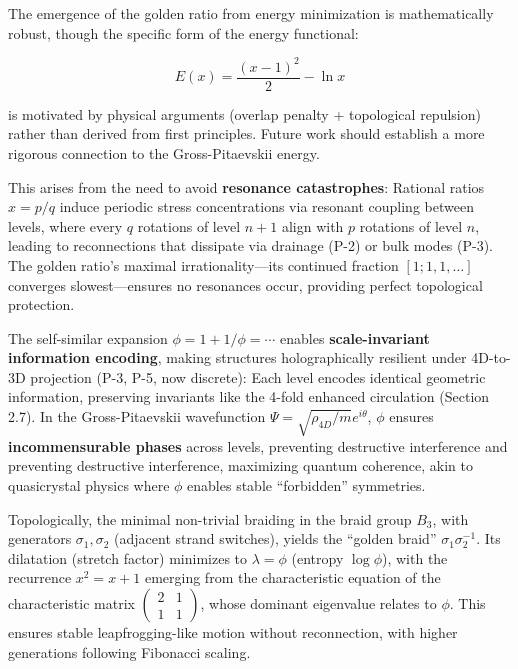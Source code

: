 The emergence of the golden ratio from energy minimization is mathematically robust, though the specific form of the energy functional:

\begin{equation}
E(x) = \frac{(x-1)^2}{2} - \ln x
\end{equation}

is motivated by physical arguments (overlap penalty + topological repulsion) rather than derived from first principles. Future work should establish a more rigorous connection to the Gross-Pitaevskii energy.

This arises from the need to avoid \textbf{resonance catastrophes}: Rational ratios $x = p/q$ induce periodic stress concentrations via resonant coupling between levels, where every $q$ rotations of level $n+1$ align with $p$ rotations of level $n$, leading to reconnections that dissipate via drainage (P-2) or bulk modes (P-3). The golden ratio's maximal irrationality---its continued fraction $[1; 1, 1, \ldots]$ converges slowest---ensures no resonances occur, providing perfect topological protection.

The self-similar expansion $\phi = 1 + 1/\phi = \cdots$ enables \textbf{scale-invariant information encoding}, making structures holographically resilient under 4D-to-3D projection (P-3, P-5, now discrete): Each level encodes identical geometric information, preserving invariants like the 4-fold enhanced circulation (Section 2.7). In the Gross-Pitaevskii wavefunction $\Psi = \sqrt{\rho_{4D}/m} e^{i \theta}$, $\phi$ ensures \textbf{incommensurable phases} across levels, preventing destructive interference and preventing destructive interference, maximizing quantum coherence, akin to quasicrystal physics where $\phi$ enables stable ``forbidden'' symmetries.

Topologically, the minimal non-trivial braiding in the braid group $B_3$, with generators $\sigma_1, \sigma_2$ (adjacent strand switches), yields the ``golden braid'' $\sigma_1 \sigma_2^{-1}$. Its dilatation (stretch factor) minimizes to $\lambda = \phi$ (entropy $\log \phi$), with the recurrence $x^2 = x + 1$ emerging from the characteristic equation of the characteristic matrix $\begin{pmatrix} 2 & 1 \\ 1 & 1 \end{pmatrix}$, whose dominant eigenvalue relates to $\phi$. This ensures stable leapfrogging-like motion without reconnection, with higher generations following Fibonacci scaling.

